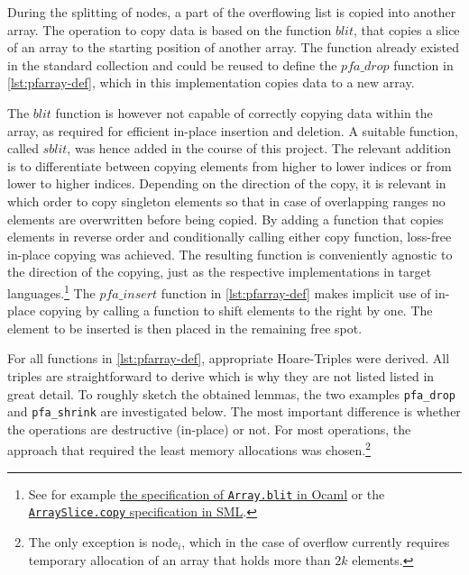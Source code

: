 
During the splitting of nodes, a part of the overflowing
list is copied into another array.
The operation to copy data is based on the function $blit$,
that copies a slice of an array to the starting position of another array.
The function already existed in the standard collection and could be reused
to define the $pfa\_drop$ function in \autoref{lst:pfarray-def}, which in this implementation copies data to a new array.

The $blit$ function is however not capable of correctly copying data
within the array, as required for efficient in-place insertion and deletion.
A suitable function, called $sblit$, was hence added in the course of this project.
The relevant addition is to differentiate between copying elements
from higher to lower indices or from lower to higher indices.
Depending on the direction of the copy, it is relevant
in which order to copy singleton elements so that in case
of overlapping ranges no elements are overwritten before being copied.
By adding a function that copies elements in reverse order
and conditionally calling either copy function,
loss-free in-place copying was achieved.
The resulting function is conveniently agnostic to the direction
of the copying, just as the respective implementations
in target languages.\footnote{
    See for example \href{https://caml.inria.fr/pub/docs/manual-ocaml/libref/Array.html}{the specification of \texttt{Array.blit} in Ocaml} or
    the \href{https://smlfamily.github.io/Basis/array-slice.html\#SIG:ARRAY_SLICE.copy:VAL}{\texttt{ArraySlice.copy} specification in SML}.
}
The $pfa\_insert$ function in \autoref{lst:pfarray-def} makes
implicit use of in-place copying by calling a function to shift elements
to the right by one.
The element to be inserted is then placed in the remaining free spot.

For all functions in \autoref{lst:pfarray-def},
appropriate Hoare-Triples were derived.
All triples are straightforward to derive which is why they are not
listed listed in great detail.
To roughly sketch the obtained lemmas, the two examples
\texttt{pfa\_drop} and \texttt{pfa\_shrink} are investigated below.
The most important difference is whether
the operations are destructive (in-place) or not.
For most operations, the approach that required the least
memory allocations was chosen.\footnote{
    The only exception is node$_i$, which in the case of overflow
    currently requires temporary allocation of an array that holds more than $2k$ elements.
}

